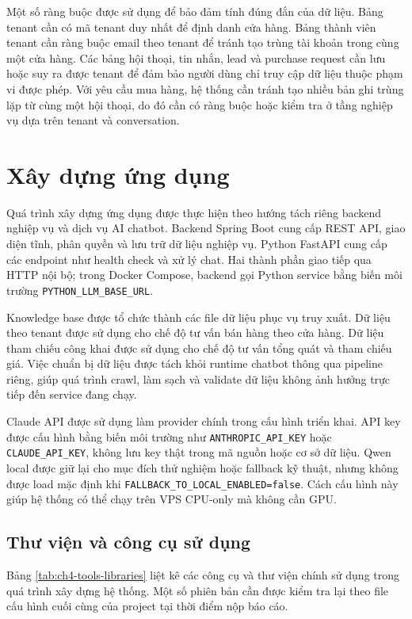 \documentclass[../DoAn.tex]{subfiles}
\begin{document}
Một số ràng buộc được sử dụng để bảo đảm tính đúng đắn của dữ liệu. Bảng tenant cần có mã tenant duy nhất để định danh cửa hàng. Bảng thành viên tenant cần ràng buộc email theo tenant để tránh tạo trùng tài khoản trong cùng một cửa hàng. Các bảng hội thoại, tin nhắn, lead và purchase request cần lưu hoặc suy ra được tenant để đảm bảo người dùng chỉ truy cập dữ liệu thuộc phạm vi được phép. Với yêu cầu mua hàng, hệ thống cần tránh tạo nhiều bản ghi trùng lặp từ cùng một hội thoại, do đó cần có ràng buộc hoặc kiểm tra ở tầng nghiệp vụ dựa trên tenant và conversation.

\section{Xây dựng ứng dụng}

Quá trình xây dựng ứng dụng được thực hiện theo hướng tách riêng backend nghiệp vụ và dịch vụ AI chatbot. Backend Spring Boot cung cấp REST API, giao diện tĩnh, phân quyền và lưu trữ dữ liệu nghiệp vụ. Python FastAPI cung cấp các endpoint như health check và xử lý chat. Hai thành phần giao tiếp qua HTTP nội bộ; trong Docker Compose, backend gọi Python service bằng biến môi trường \texttt{PYTHON\_LLM\_BASE\_URL}.

Knowledge base được tổ chức thành các file dữ liệu phục vụ truy xuất. Dữ liệu theo tenant được sử dụng cho chế độ tư vấn bán hàng theo cửa hàng. Dữ liệu tham chiếu công khai được sử dụng cho chế độ tư vấn tổng quát và tham chiếu giá. Việc chuẩn bị dữ liệu được tách khỏi runtime chatbot thông qua pipeline riêng, giúp quá trình crawl, làm sạch và validate dữ liệu không ảnh hưởng trực tiếp đến service đang chạy.

Claude API được sử dụng làm provider chính trong cấu hình triển khai. API key được cấu hình bằng biến môi trường như \texttt{ANTHROPIC\_API\_KEY} hoặc \texttt{CLAUDE\_API\_KEY}, không lưu key thật trong mã nguồn hoặc cơ sở dữ liệu. Qwen local được giữ lại cho mục đích thử nghiệm hoặc fallback kỹ thuật, nhưng không được load mặc định khi \texttt{FALLBACK\_TO\_LOCAL\_ENABLED=false}. Cách cấu hình này giúp hệ thống có thể chạy trên VPS CPU-only mà không cần GPU.

\subsection{Thư viện và công cụ sử dụng}

Bảng \ref{tab:ch4-tools-libraries} liệt kê các công cụ và thư viện chính sử dụng trong quá trình xây dựng hệ thống. Một số phiên bản cần được kiểm tra lại theo file cấu hình cuối cùng của project tại thời điểm nộp báo cáo.
\end{document}
